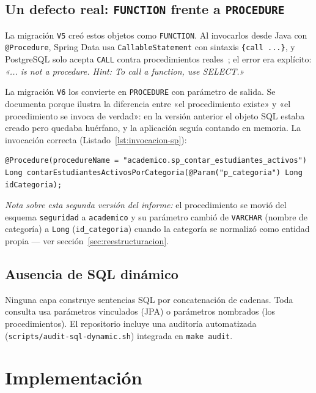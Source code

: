 \documentclass[11pt,a4paper]{article}
\newcommand{\ruta}[1]{\texttt{\footnotesize #1}}
\begin{document}
\subsection{Un defecto real: \texttt{FUNCTION} frente a \texttt{PROCEDURE}}

La migración \texttt{V5} creó estos objetos como \texttt{FUNCTION}. Al
invocarlos desde Java con \texttt{@Procedure}, Spring Data usa
\texttt{CallableStatement} con sintaxis \texttt{\{call ...\}}, y PostgreSQL
solo acepta \texttt{CALL} contra procedimientos reales~\cite{postgresql16};
el error era explícito: \emph{«... is not a procedure. Hint: To call a
function, use SELECT.»}

La migración \texttt{V6} los convierte en \texttt{PROCEDURE} con parámetro de
salida. Se documenta porque ilustra la diferencia entre «el procedimiento
existe» y «el procedimiento se invoca de verdad»: en la versión anterior el
objeto SQL estaba creado pero quedaba huérfano, y la aplicación seguía
contando en memoria. La invocación correcta
(Listado~\ref{lst:invocacion-sp}):

\begin{lstlisting}[caption={Invocación real desde el repositorio (\ruta{academico/estudiante/repository/EstudianteRepository.java})},label={lst:invocacion-sp}]
@Procedure(procedureName = "academico.sp_contar_estudiantes_activos")
Long contarEstudiantesActivosPorCategoria(@Param("p_categoria") Long idCategoria);
\end{lstlisting}

\emph{Nota sobre esta segunda versión del informe:} el procedimiento se
movió del esquema \texttt{seguridad} a \texttt{academico} y su parámetro
cambió de \texttt{VARCHAR} (nombre de categoría) a \texttt{Long}
(\texttt{id\_categoria}) cuando la categoría se normalizó como entidad
propia — ver sección~\ref{sec:reestructuracion}.

\subsection{Ausencia de SQL dinámico}

Ninguna capa construye sentencias SQL por concatenación de cadenas. Toda
consulta usa parámetros vinculados (JPA) o parámetros nombrados (los
procedimientos). El repositorio incluye una auditoría automatizada
(\ruta{scripts/audit-sql-dynamic.sh}) integrada en \texttt{make audit}.

\section{Implementación}
\label{sec:implementacion}
\end{document}
